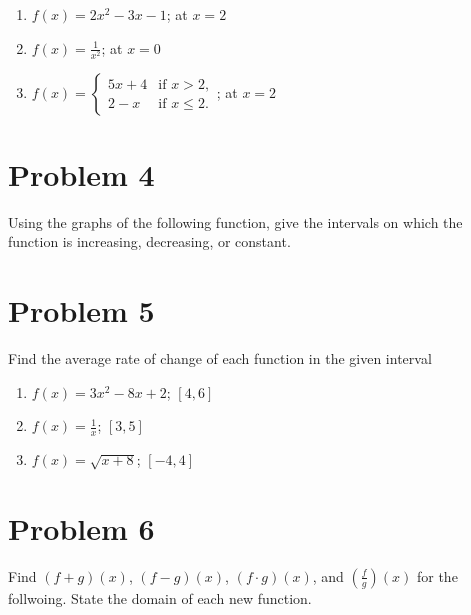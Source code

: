\documentclass[tikz,border=10pt]{article}
\begin{document}
\begin{enumerate}
    \item $f(x) = 2x^{2} -3x -1$; at $x = 2$
    \item $f(x) = \frac{1}{x^{2}}$; at $x = 0$
    \item $f(x) = \begin{cases}
         5x + 4 & \text{if } x > 2, \\
         2 - x & \text{if } x \leq 2.
       \end{cases}$; at $x = 2$
\end{enumerate}

\section*{Problem 4}
Using the graphs of the following function, give the intervals on which the function is increasing, decreasing, or constant.

\begin{center}
\end{center}

\section*{Problem 5}

Find the average rate of change of each function in the given interval

\begin{enumerate}
    \item $f(x) = 3x^{2} - 8x + 2$; $[4,6]$
    \item $f(x) = \frac{1}{x}$; $[3,5]$
    \item $f(x) = \sqrt{x + 8}$; $[-4, 4]$
\end{enumerate}

\section*{Problem 6}

Find $(f + g)(x)$, $(f - g)(x)$, $(f\cdot g)(x)$, and $(\frac{f}{g})(x)$ for the follwoing. State the domain of each new function.
\end{document}
